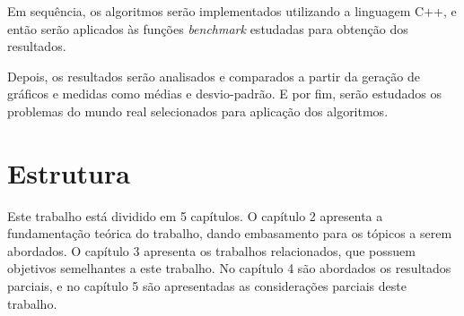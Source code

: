 Em sequência, os algoritmos serão implementados utilizando a linguagem C++, e então serão aplicados às funções \textit{benchmark} estudadas para obtenção dos resultados.

Depois, os resultados serão analisados e comparados a partir da geração de gráficos e medidas como médias e desvio-padrão. E por fim, serão estudados os problemas do mundo real selecionados para aplicação dos algoritmos.

\section{Estrutura}

Este trabalho está dividido em 5 capítulos. O capítulo 2 apresenta a fundamentação teórica do trabalho, dando embasamento para os tópicos a serem abordados. O capítulo 3 apresenta os trabalhos relacionados, que possuem objetivos semelhantes a este trabalho. No capítulo 4 são abordados os resultados parciais, e no capítulo 5 são apresentadas as considerações parciais deste trabalho.



